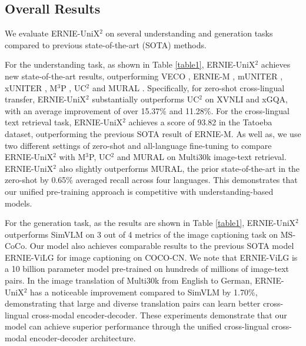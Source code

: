 \documentclass{article}
\begin{document}
\subsection{Overall Results}
We evaluate ERNIE-UniX$^{2}$ on several understanding and generation tasks compared to previous state-of-the-art (SOTA) methods.  

For the understanding task, as shown in Table \ref{table1},  ERNIE-UniX$^{2}$ achieves new state-of-the-art results, outperforming VECO  \cite{luo2021veco}, ERNIE-M \cite{erniem2020}, mUNITER  \cite{uniter2021}, xUNITER \cite{uniter2021}, M$^3$P \cite{m3p2020}, UC$^2$ \cite{UC22021} and MURAL \cite{mural2021}. Specifically, for zero-shot cross-lingual transfer, ERNIE-UniX$^{2}$ substantially outperforms UC$^2$ on XVNLI and xGQA, with an average improvement of over 15.37\% and 11.28\%. For the cross-lingual text retrieval task, ERNIE-UniX$^{2}$ achieves a score of 93.82 in the Tatoeba dataset, outperforming the previous SOTA result of ERNIE-M. As well as, we use two different settings of zero-shot and all-language fine-tuning to compare ERNIE-UniX$^{2}$ with M$^3$P, UC$^2$ and MURAL on Multi30k image-text retrieval. ERNIE-UniX$^{2}$ also slightly outperforms MURAL, the prior state-of-the-art in the zero-shot by 0.65\% averaged recall across four languages. This demonstrates that our unified pre-training approach is competitive with understanding-based models. 

For the generation task, as the results are shown in Table \ref{table1}, 
ERNIE-UniX$^{2}$ outperforms SimVLM \cite{simvlm2021} on 3 out of 4 metrics of the image captioning task on MS-CoCo. Our model also achieves comparable results to the previous SOTA model ERNIE-ViLG \cite{ernievilg2021} for image captioning on COCO-CN. We note that ERNIE-ViLG is a 10 billion parameter model pre-trained on hundreds of millions of image-text pairs. In the image translation of Multi30k from English to German, ERNIE-UniX$^{2}$ has a noticeable improvement compared to SimVLM by 1.70\%, demonstrating that large and diverse translation pairs can learn better cross-lingual cross-modal encoder-decoder. These experiments demonstrate that our model can achieve superior performance through the unified cross-lingual cross-modal encoder-decoder architecture.
\end{document}
